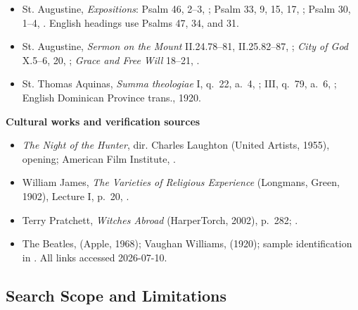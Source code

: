 \begin{deepstudy}
{\begin{itemize}[itemsep=0em,topsep=0.15em,parsep=0pt]
\item St. Augustine, \emph{Expositions}: Psalm 46, 2--3, ; Psalm 33, 9, 15, 17, ; Psalm 30, 1--4, . English headings use Psalms 47, 34, and 31.
\item St. Augustine, \emph{Sermon on the Mount} II.24.78--81, II.25.82--87, ; \emph{City of God} X.5--6, 20, ; \emph{Grace and Free Will} 18--21, .
\item St. Thomas Aquinas, \emph{Summa theologiae} I, q.~22, a.~4, ; III, q.~79, a.~6, ; English Dominican Province trans., 1920.
\end{itemize}
}

\textbf{Cultural works and verification sources}
{\footnotesize
\begin{itemize}[itemsep=0em,topsep=0.15em,parsep=0pt]
\item \emph{The Night of the Hunter}, dir. Charles Laughton (United Artists, 1955), opening; American Film Institute, .
\item William James, \emph{The Varieties of Religious Experience} (Longmans, Green, 1902), Lecture I, p.~20, .
\item Terry Pratchett, \emph{Witches Abroad} (HarperTorch, 2002), p.~282; .
\item The Beatles,  (Apple, 1968); Vaughan Williams,  (1920); sample identification in . All links accessed 2026-07-10.
\end{itemize}
}

\subsection*{Search Scope and Limitations}


\end{deepstudy}
